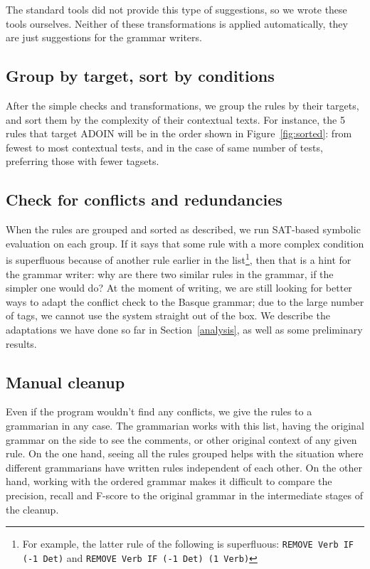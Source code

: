 \documentclass[11pt]{article}
\begin{document}
The standard tools did not provide this type of suggestions, so we wrote these tools ourselves. Neither of these transformations is applied automatically, they are just suggestions for the grammar writers.



\subsection{Group by target, sort by conditions}
After the simple checks and transformations, we group the rules by their targets, and sort them by the complexity of their contextual texts. For instance, the 5 rules that target ADOIN will be in the order shown in Figure~\ref{fig:sorted}: from fewest to most contextual tests, and in the case of same number of tests, preferring those with fewer tagsets.


\subsection{Check for conflicts and redundancies}

When the rules are grouped and sorted as described, we run SAT-based 
symbolic evaluation \cite{listenmaa_claessen2016} on each group. 
If it says that some rule with a more complex condition is superfluous 
because of another rule earlier in the list\footnote{For example, the latter rule of the following is superfluous: \texttt{REMOVE Verb IF (-1 Det)} and \texttt{REMOVE Verb IF (-1 Det) (1 Verb)}}, 
then that is a hint for the grammar writer: why are there two similar 
rules in the grammar, if the simpler one would do?
At the moment of writing, we are still looking for better ways to adapt the conflict check
to the Basque grammar; due to the large number of tags, we cannot use
the system straight out of the box.
We describe the adaptations we have done so far in Section~\ref{analysis},
as well as some preliminary results.

\subsection{Manual cleanup}
\label{manual} 

Even if the program wouldn't find any conflicts, we give the rules to 
a grammarian in any case. The grammarian works with this list, having 
the original grammar on the side to see the comments, or other original 
context of any given rule. 
On the one hand, seeing all the rules grouped helps with the 
situation where different grammarians have written rules independent of 
each other. On the other hand, working with the ordered grammar makes
it difficult to compare the precision, recall and F-score to the
original grammar in the intermediate stages of the cleanup. 
\end{document}
